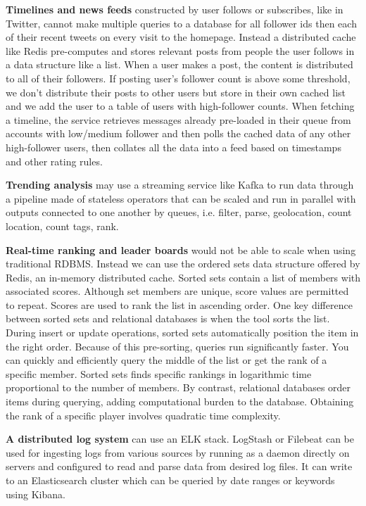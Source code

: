 \documentclass{article}
\begin{document}
    \textbf{Timelines and news feeds} constructed by user follows or subscribes, like in Twitter, cannot make multiple queries to a database for all follower ids then each of their recent tweets on every visit to the homepage. Instead a distributed cache like Redis pre-computes and stores relevant posts from people the user follows in a data structure like a list. When a user makes a post, the content is distributed to all of their followers. If posting user's follower count is above some threshold, we don't distribute their posts to other users but store in their own cached list and we add the user to a table of users with high-follower counts. When fetching a timeline, the service retrieves messages already pre-loaded in their queue from accounts with low/medium follower and then polls the cached data of any other high-follower users, then collates all the data into a feed based on timestamps and other rating rules.
    
    \textbf{Trending analysis} may use a streaming service like Kafka to run data through a pipeline made of stateless operators that can be scaled and run in parallel with outputs connected to one another by queues, i.e. filter, parse, geolocation, count location, count tags, rank.
    
    \textbf{Real-time ranking and leader boards} would not be able to scale when using traditional RDBMS. Instead we can use the ordered sets data structure offered by Redis, an in-memory distributed cache. Sorted sets contain a list of members with associated scores. Although set members are unique, score values are permitted to repeat. Scores are used to rank the list in ascending order. One key difference between sorted sets and relational databases is when the tool sorts the list. During insert or update operations, sorted sets automatically position the item in the right order. Because of this pre-sorting, queries run significantly faster. You can quickly and efficiently query the middle of the list or get the rank of a specific member. Sorted sets finds specific rankings in logarithmic time proportional to the number of members. By contrast, relational databases order items during querying, adding computational burden to the database. Obtaining the rank of a specific player involves quadratic time complexity.
    
    \textbf{A distributed log system} can use an ELK stack. LogStash or Filebeat can be used for ingesting logs from various sources by running as a daemon directly on servers and configured to read and parse data from desired log files. It can write to an Elasticsearch cluster which can be queried by date ranges or keywords using Kibana.
    
\end{document}
